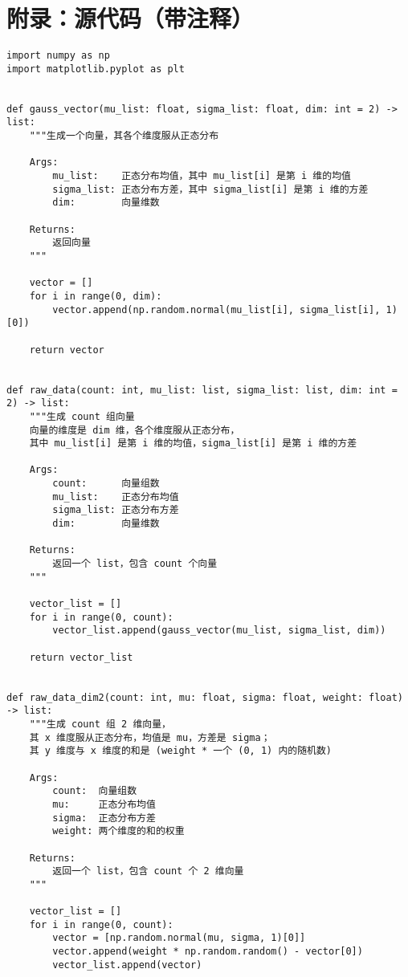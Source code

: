 \appendix

\section{附录：源代码（带注释）}

\begin{verbatim}
import numpy as np
import matplotlib.pyplot as plt


def gauss_vector(mu_list: float, sigma_list: float, dim: int = 2) -> list:
    """生成一个向量，其各个维度服从正态分布

    Args:
        mu_list:    正态分布均值，其中 mu_list[i] 是第 i 维的均值
        sigma_list: 正态分布方差，其中 sigma_list[i] 是第 i 维的方差
        dim:        向量维数

    Returns:
        返回向量
    """

    vector = []
    for i in range(0, dim):
        vector.append(np.random.normal(mu_list[i], sigma_list[i], 1)[0])

    return vector


def raw_data(count: int, mu_list: list, sigma_list: list, dim: int = 2) -> list:
    """生成 count 组向量
    向量的维度是 dim 维，各个维度服从正态分布，
    其中 mu_list[i] 是第 i 维的均值，sigma_list[i] 是第 i 维的方差

    Args:
        count:      向量组数
        mu_list:    正态分布均值
        sigma_list: 正态分布方差
        dim:        向量维数

    Returns:
        返回一个 list，包含 count 个向量
    """

    vector_list = []
    for i in range(0, count):
        vector_list.append(gauss_vector(mu_list, sigma_list, dim))

    return vector_list


def raw_data_dim2(count: int, mu: float, sigma: float, weight: float) -> list:
    """生成 count 组 2 维向量，
    其 x 维度服从正态分布，均值是 mu，方差是 sigma；
    其 y 维度与 x 维度的和是 (weight * 一个 (0, 1) 内的随机数)

    Args:
        count:  向量组数
        mu:     正态分布均值
        sigma:  正态分布方差
        weight: 两个维度的和的权重

    Returns:
        返回一个 list，包含 count 个 2 维向量
    """

    vector_list = []
    for i in range(0, count):
        vector = [np.random.normal(mu, sigma, 1)[0]]
        vector.append(weight * np.random.random() - vector[0])
        vector_list.append(vector)


\end{verbatim}
